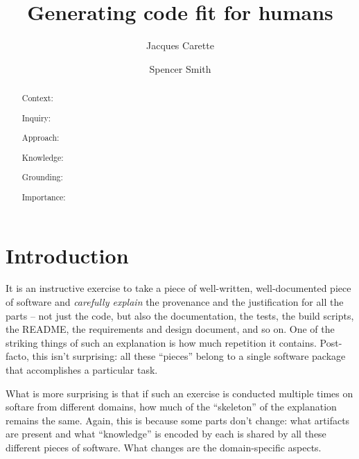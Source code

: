 \documentclass[english,submission]{programming}
\begin{document}
\title{Generating code fit for humans} %

\author[a]{Jacques Carette}
\author[a]{Spencer Smith}




\maketitle

\begin{abstract}
  Context:

  Inquiry:

  Approach:

  Knowledge:

  Grounding:

  Importance:

\end{abstract}

\section{Introduction}
\label{sec:intro}

It is an instructive exercise to take a piece of well-written, well-documented
piece of software and \emph{carefully explain} the provenance and the justification
for all the parts -- not just the code, but also the documentation, the tests, the
build scripts, the README, the requirements and design document, and so on.
One of the striking things of such an explanation is how much repetition it contains.
Post-facto, this isn't surprising: all these ``pieces'' belong to a single software
package that accomplishes a particular task.

What is more surprising is that if such an exercise is conducted multiple times
on softare from different domains, how much of the ``skeleton'' of the explanation
remains the same. Again, this is because some parts don't change: what artifacts
are present and what ``knowledge'' is encoded by each is shared by all these different
pieces of software. What changes are the domain-specific aspects.
\end{document}
